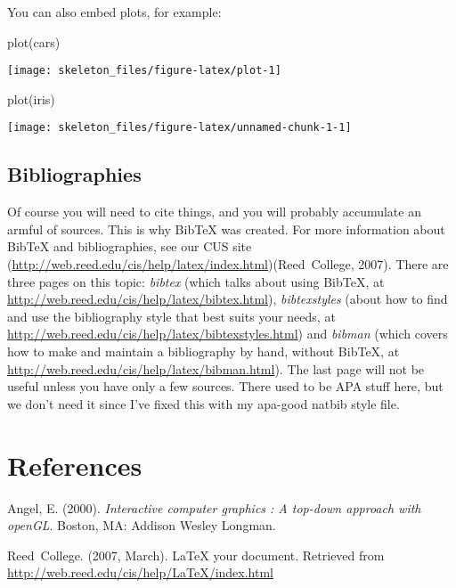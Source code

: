 \documentclass[12pt,twoside]{reedthesis}
\renewcommand{\bibname}{References}
\begin{document}
  You can also embed plots, for example:
  
  \begin{CodeChunk}
  \begin{CodeInput}
  plot(cars)
  \end{CodeInput}
  
  
  \begin{center}\texttt{[image: skeleton\_files/figure-latex/plot-1]} \end{center}
  
  \end{CodeChunk}
  
  \begin{CodeChunk}
  \begin{CodeInput}
  plot(iris)
  \end{CodeInput}
  
  
  \begin{center}\texttt{[image: skeleton\_files/figure-latex/unnamed-chunk-1-1]} \end{center}
  
  \end{CodeChunk}
  
  \section{Bibliographies}
  
  Of course you will need to cite things, and you will probably accumulate
  an armful of sources. This is why BibTeX was created. For more
  information about BibTeX and bibliographies, see our CUS site
  (\url{http://web.reed.edu/cis/help/latex/index.html})(Reed~College,
  2007). There are three pages on this topic: \emph{bibtex} (which talks
  about using BibTeX, at
  \url{http://web.reed.edu/cis/help/latex/bibtex.html}),
  \emph{bibtexstyles} (about how to find and use the bibliography style
  that best suits your needs, at
  \url{http://web.reed.edu/cis/help/latex/bibtexstyles.html}) and
  \emph{bibman} (which covers how to make and maintain a bibliography by
  hand, without BibTeX, at
  \url{http://web.reed.edu/cis/help/latex/bibman.html}). The last page
  will not be useful unless you have only a few sources. There used to be
  APA stuff here, but we don't need it since I've fixed this with my
  apa-good natbib style file.
  
  \backmatter
  
  \setlength{\parindent}{0cm} \setlength{\parskip}{\medskipamount}
  
  \chapter*{\bibname}
  
  Angel, E. (2000). \emph{Interactive computer graphics : A top-down
  approach with openGL}. Boston, MA: Addison Wesley Longman.
  
  Reed~College. (2007, March). LaTeX your document. Retrieved from
  \url{http://web.reed.edu/cis/help/LaTeX/index.html}

\end{document}
